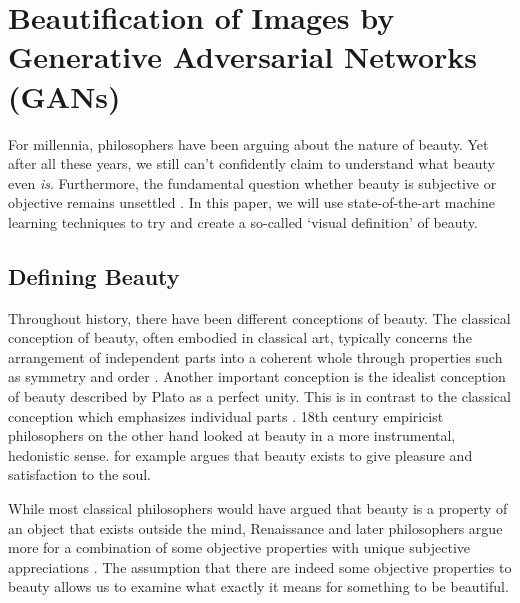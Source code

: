\documentclass[../main.tex]{subfiles}
\begin{document}
\section{Beautification of Images by Generative Adversarial Networks (GANs)}
For millennia, philosophers have been arguing about the nature of beauty. Yet after all these years, we still can't confidently claim to understand what beauty even \textit{is}. Furthermore, the fundamental question whether beauty is subjective or objective remains unsettled \parencite{sep-beauty}. In this paper, we will use state-of-the-art machine learning techniques to try and create a so-called `visual definition' of beauty.


\subsection{Defining Beauty}
Throughout history, there have been different conceptions of beauty. The classical conception of beauty, often embodied in classical art, typically concerns the arrangement of independent parts into a coherent whole through properties such as symmetry and order \parencite{wolfflin1932principles, sep-beauty}. Another important conception is the idealist conception of beauty described by Plato as a perfect unity. This is in contrast to the classical conception which emphasizes individual parts \parencite{sep-beauty}. 18th century empiricist philosophers on the other hand looked at beauty in a more instrumental, hedonistic sense. \textcite{hume2003treatise} for example argues that beauty exists to give pleasure and satisfaction to the soul.

While most classical philosophers would have argued that beauty is a property of an object that exists outside the mind, Renaissance and later philosophers argue more for a combination of some objective properties with unique subjective appreciations \parencite{sartwell2017entanglements}. The assumption that there are indeed some objective properties to beauty allows us to examine what exactly it means for something to be beautiful.





\end{document}
